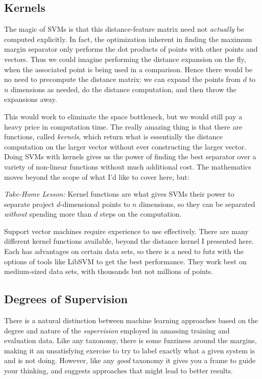 \documentclass[10pt]{article}
\begin{document}
\begin{enumerate}
\subsection{Kernels}
The magic of SVMs is that this distance-feature matrix need not \textit{actually} be computed explicitly. In fact, the optimization inherent in finding the maximum margin separator only performs the dot products of points with other points and vectors. Thus we could imagine performing the distance expansion on the fly, when the associated point is being used in a comparison. Hence there would be no need to precompute the distance matrix: we can expand the points from $d$ to $n$ dimensions as needed, do the distance computation, and then throw the expansions away.

This would work to eliminate the space bottleneck, but we would still pay a heavy price in computation time. The really amazing thing is that there are functions, called \textit{kernels}, which return what is essentially the distance computation on the larger vector without ever constructing the larger vector. Doing SVMs with kernels gives us the power of finding the best separator over a variety of non-linear functions without much additional cost. The mathematics moves beyond the scope of what I’d like to cover here, but:

\textit{Take-Home Lesson:} Kernel functions are what gives SVMs their power to separate project $d$-dimensional points to $n$ dimensions, so they can be separated \textit{without} spending more than $d$ steps on the computation.

Support vector machines require experience to use effectively. There are many different kernel functions available, beyond the distance kernel I presented here. Each has advantages on certain data sets, so there is a need to futz with the options of tools like LibSVM to get the best performance. They work best on medium-sized data sets, with thousands but not millions of points.

\subsection{Degrees of Supervision}
There is a natural distinction between machine learning approaches based on the degree and nature of the \textit{supervision} employed in amassing training and evaluation data. Like any taxonomy, there is some fuzziness around the margins, making it an unsatisfying exercise to try to label exactly what a given system is and is not doing. However, like any \textit{good} taxonomy it gives you a frame to guide your thinking, and suggests approaches that might lead to better results.


\end{enumerate}
\end{document}
